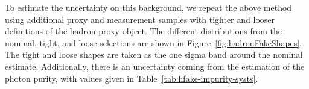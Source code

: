 To estimate the uncertainty on this background, we repeat the above method using additional proxy and measurement samples with tighter and looser definitions of the hadron proxy object.
The different distributions from the nominal, tight, and loose selections are shown in Figure~\ref{fig:hadronFakeShapes}. 
The tight and loose shapes are taken as the one sigma band around the nominal estimate. 
Additionally, there is an uncertainty coming from the estimation of the photon purity, with values given in Table~\ref{tab:hfake-impurity-systs}. 
